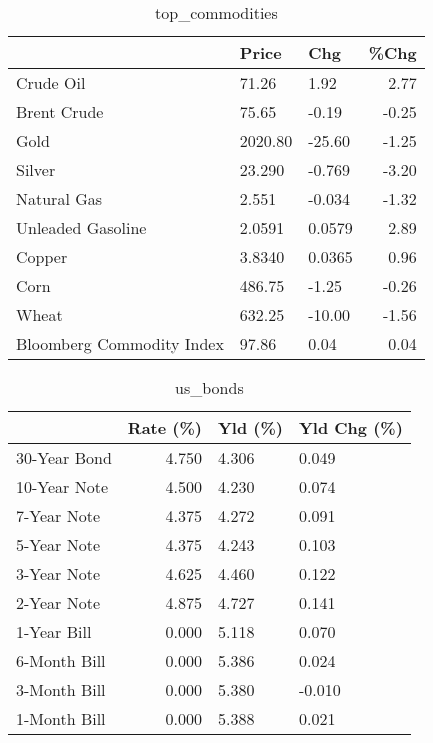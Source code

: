 \documentclass{article}%
\begin{document}
\begin{table}[htbp]%
\caption{top\_commodities}%
\centering%
\begin{adjustbox}{width=1\textwidth}%
\begin{tabular}{lllr}
\toprule
                          &   Price &    Chg &  \%Chg \\
\midrule
               Crude Oil  &   71.26 &   1.92 &  2.77 \\
             Brent Crude  &   75.65 &  -0.19 & -0.25 \\
                    Gold  & 2020.80 & -25.60 & -1.25 \\
                  Silver  &  23.290 & -0.769 & -3.20 \\
             Natural Gas  &   2.551 & -0.034 & -1.32 \\
       Unleaded Gasoline  &  2.0591 & 0.0579 &  2.89 \\
                  Copper  &  3.8340 & 0.0365 &  0.96 \\
                    Corn  &  486.75 &  -1.25 & -0.26 \\
                   Wheat  &  632.25 & -10.00 & -1.56 \\
Bloomberg Commodity Index &   97.86 &   0.04 &  0.04 \\
\bottomrule
\end{tabular}
%
\end{adjustbox}%
\end{table}

%


\begin{table}[htbp]%
\caption{us\_bonds}%
\centering%
\begin{adjustbox}{width=1\textwidth}%
\begin{tabular}{lrll}
\toprule
             &  Rate (\%) & Yld (\%) & Yld Chg (\%) \\
\midrule
30-Year Bond &     4.750 &   4.306 &       0.049 \\
10-Year Note &     4.500 &   4.230 &       0.074 \\
 7-Year Note &     4.375 &   4.272 &       0.091 \\
 5-Year Note &     4.375 &   4.243 &       0.103 \\
 3-Year Note &     4.625 &   4.460 &       0.122 \\
 2-Year Note &     4.875 &   4.727 &       0.141 \\
 1-Year Bill &     0.000 &   5.118 &       0.070 \\
6-Month Bill &     0.000 &   5.386 &       0.024 \\
3-Month Bill &     0.000 &   5.380 &      -0.010 \\
1-Month Bill &     0.000 &   5.388 &       0.021 \\
\bottomrule
\end{tabular}
%
\end{adjustbox}%
\end{table}
\end{document}
